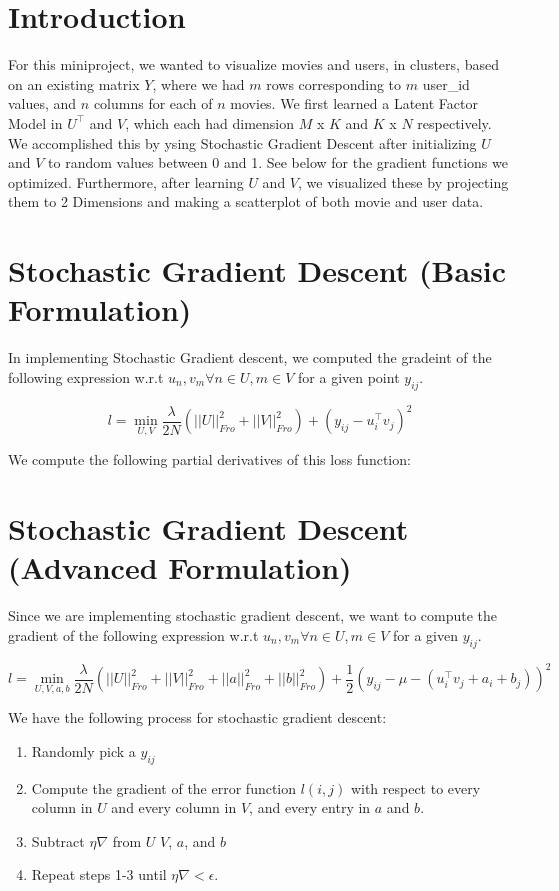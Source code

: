\documentclass{article}
\begin{document}
\section*{Introduction}

For this miniproject, we wanted to visualize movies and users, in clusters,
based on an existing matrix $Y$, where we had $m$ rows corresponding to $m$
user\_id values, and $n$ columns for each of $n$ movies. We first learned
a Latent Factor Model in $U^{\intercal}$ and $V$, which each had dimension
$M$ x $K$ and $K$ x $N$ respectively. We accomplished this by ysing Stochastic
Gradient Descent after initializing $U$ and $V$ to random values between 0 and 1.
See below for the gradient functions we optimized. Furthermore, after learning
$U$ and $V$, we visualized these by projecting them to 2 Dimensions and making
a scatterplot of both movie and user data.


\section*{Stochastic Gradient Descent (Basic Formulation)}

In implementing Stochastic Gradient descent, we computed the gradeint
of the following expression w.r.t $u_{n}, v_{m} \forall n \in U, m \in V$
for a given point $y_{ij}$.

$$ l = \min_{U, V} \frac{\lambda}{2N} (||U||^{2}_{Fro} + ||V||^{2}_{Fro}) +
(y_{ij} - u_{i}^{\intercal}v_{j})^{2} $$

We compute the following partial derivatives of this loss function:






\section*{Stochastic Gradient Descent (Advanced Formulation)}

Since we are implementing stochastic gradient descent, we want to
compute the gradient of the following expression w.r.t $u_{n}, v_{m} \forall n \in U, m \in V$ for
a given $y_{ij}$.

$$ l =  \min_{U, V, a, b} \frac{\lambda}{2N} (||U||^{2}_{Fro} + ||V||^{2}_{Fro}
+ ||a||^{2}_{Fro} + ||b||^{2}_{Fro}) + \frac{1}{2} (y_{ij} - \mu - (u_{i}^{\intercal}v_{j} + a_{i} + b_{j}))^{2} $$

We have the following process for stochastic gradient descent:

\begin{enumerate}
    \item Randomly pick a $y_{ij}$
    \item Compute the gradient of the error function $l(i,j)$ with respect to every column
        in $U$ and every column in $V$, and every entry in $a$ and $b$.
    \item Subtract $\eta \nabla$ from $U$ $V$, $a$, and $b$
    \item Repeat steps 1-3 until $\eta \nabla < \epsilon$.
\end{enumerate}
\end{document}
